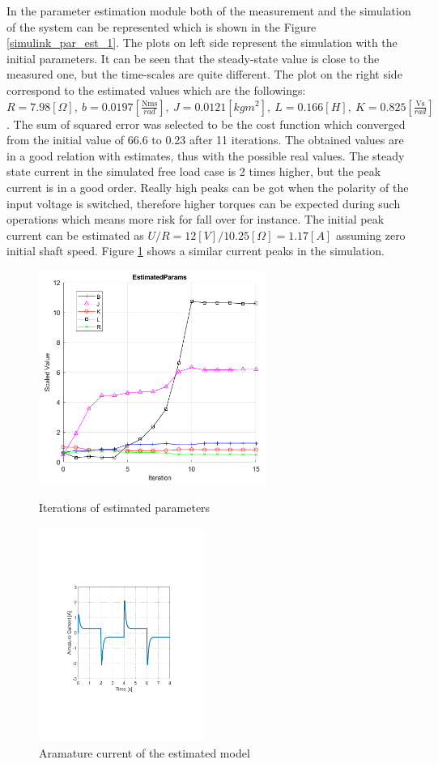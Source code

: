 \documentclass[12pt,english]{article}
\begin{document}
 In the parameter estimation module both of the measurement and the simulation of the system can be represented which is shown in the Figure \ref{simulink_par_est_1}. The plots on left side represent the simulation with the initial parameters. It can be seen that the steady-state value is close to the measured one, but the time-scales are quite different. The plot on the right side correspond to the estimated values which are the followings: $R=7.98[\Omega],~b=0.0197[\frac{\text{Nms}}{rad}],~J=0.0121[kgm^2],~L=0.166[H],~K=0.825[\frac{\text{Vs}}{rad}]$. The sum of squared error was selected to be the cost function which converged from the initial value of 66.6 to 0.23 after 11 iterations. The obtained values are in a good relation with estimates, thus with the possible real values. The steady state current in the simulated free load case is 2 times higher, but the peak current is in a good order. Really high peaks can be got when the polarity of the input voltage is switched, therefore higher torques can be expected during such operations which means more risk for fall over for instance. The initial peak current can be estimated as $U/R = 12[V]/10.25[\Omega] = 1.17 [A]$ assuming zero initial shaft speed. Figure \ref{simulink_armature_current} shows a similar current peaks in the simulation.
 \begin{figure}[htb!]
 	\centering
 	\includegraphics[height=7cm]{figures/simulink_par_est_2.png}
 	\caption{Iterations of estimated parameters}
 	\endminipage\hfill
 	\centering
 	\includegraphics[height=7cm]{figures/simulink_armature_current}
 	\caption{Aramature current of the estimated model}
 	\label{simulink_armature_current}
 	\endminipage\hfill
 \end{figure}
\end{document}
